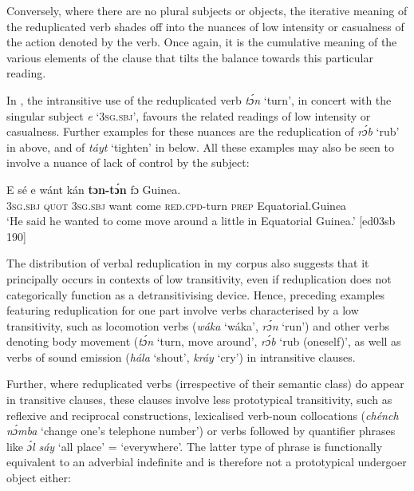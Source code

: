 Conversely, where there are no plural subjects or objects, the iterative meaning of the reduplicated verb shades off into the nuances of low intensity or casualness of the action denoted by the verb. Once again, it is the cumulative meaning of the various elements of the clause that tilts the balance towards this particular reading. 


In , the intransitive use of the reduplicated verb \textit{tɔ́n} ‘turn’, in concert with the singular subject \textit{e} ‘\textsc{3sg.sbj}’, favours the related readings of low intensity or casualness. Further examples for these nuances are the reduplication of \textit{rɔ́b} ‘rub’ in  above, and of \textit{táyt} ‘tighten’ in  below. All these examples may also be seen to involve a nuance of lack of control by the subject:



\ea%
    \label{ex:key:143}
    \gll E    sé    e    wánt  kán    \textbf{tɔn-tɔ́n} fɔ  Guinea.\\
\textsc{3sg.sbj}  \textsc{quot}    \textsc{3sg.sbj}  want  come  \textsc{red.cpd-}turn  \textsc{prep}  Equatorial.Guinea\\

\glt ‘He said he wanted to come move around a little in Equatorial Guinea.’ [ed03sb 190]
\z

The distribution of verbal reduplication in my corpus also suggests that it principally occurs in contexts of low transitivity, even if reduplication does not categorically function as a detransitivising device. Hence, preceding examples featuring reduplication for one part involve verbs characterised by a low transitivity, such as locomotion verbs (\textit{wáka} ‘wáka’, \textit{rɔ́n} ‘run’) and other verbs denoting body movement (\textit{tɔ́n} ‘turn, move around’, \textit{rɔ́b} ‘rub (oneself)’, as well as verbs of sound emission (\textit{hála} ‘shout’, \textit{kráy} ‘cry’) in intransitive clauses. 


Further, where reduplicated verbs (irrespective of their semantic class) do appear in transitive clauses, these clauses involve less prototypical transitivity, such as reflexive and reciprocal constructions, lexicalised verb-noun collocations (\textit{chénch} \textit{nɔ́mba} ‘change one’s telephone number’) or verbs followed by quantifier phrases like \textit{ɔ́l sáy} ‘all place’ = ‘everywhere’. The latter type of phrase is functionally equivalent to an adverbial indefinite and is therefore not a prototypical undergoer object either: 



